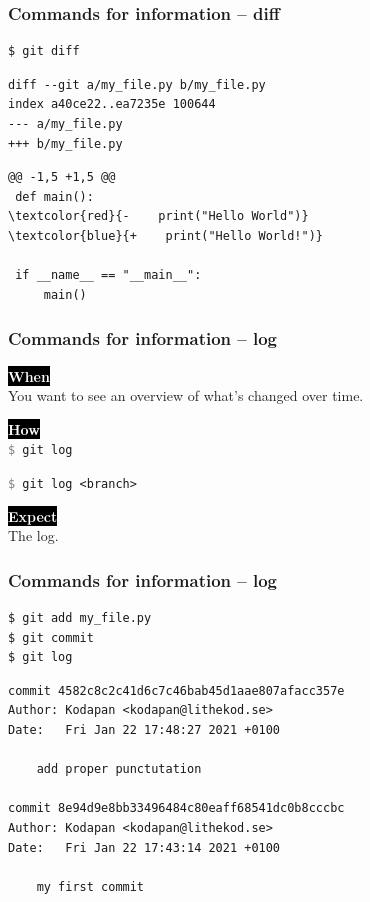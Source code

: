 \documentclass{beamer}
\newcommand{\keyword}[1]{\hspace{-1.0em}\colorbox{black}{\textcolor{white}{\textbf{#1}\vphantom{Ep}}}\vspace{0.2em}} %
\newcommand{\command}[1]{\texttt{\textcolor{gray}{\$} {#1}}}
\begin{document}
\begin{frame}[fragile]
  \frametitle{Commands for information -- diff}

\begin{verbatim}
$ git diff
\end{verbatim}
\pause{}
\vspace{-2.4ex}
{
\color{gray}
\begin{Verbatim}[commandchars=\\\{\}]
diff --git a/my_file.py b/my_file.py
index a40ce22..ea7235e 100644
--- a/my_file.py
+++ b/my_file.py
\end{Verbatim}
}
\pause{}
\begin{Verbatim}[commandchars=\\\{\}]
@@ -1,5 +1,5 @@
 def main():
\textcolor{red}{-    print("Hello World")}
\textcolor{blue}{+    print("Hello World!")}
 
 if __name__ == "__main__":
     main()
\end{Verbatim}
\end{frame}

\begin{frame}
  \frametitle{Commands for information -- log}

  \keyword{When}\\
  You want to see an overview of what's changed over time.
  \vspace{0.5em}

  \keyword{How}\\
  \command{git log}

  \command{git log <branch>}
  \vspace{0.5em}

  \keyword{Expect}\\
  The log.
\end{frame}

\begin{frame}[fragile]
  \frametitle{Commands for information -- log}
\begin{Verbatim}
$ git add my_file.py
$ git commit
$ git log
\end{Verbatim}
\pause{}
\vspace{-1.2ex} %
\begin{Verbatim}
commit 4582c8c2c41d6c7c46bab45d1aae807afacc357e
Author: Kodapan <kodapan@lithekod.se>
Date:   Fri Jan 22 17:48:27 2021 +0100

    add proper punctutation

commit 8e94d9e8bb33496484c80eaff68541dc0b8cccbc
Author: Kodapan <kodapan@lithekod.se>
Date:   Fri Jan 22 17:43:14 2021 +0100

    my first commit
\end{Verbatim}
\end{frame}
\end{document}
